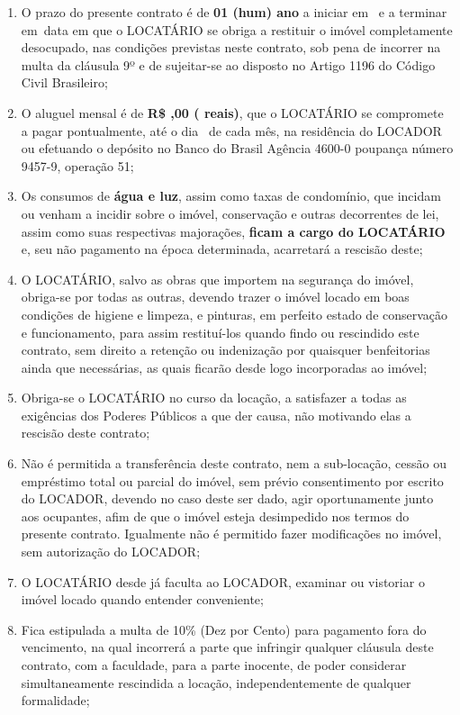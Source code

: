 \documentclass[a4paper,12pt]{article}
\begin{document}
\begin{enumerate}

\item O prazo do presente contrato é de \textbf{01 (hum) ano} a iniciar em 
\ e a terminar em\ data em que o LOCATÁRIO 
se obriga a restituir o imóvel completamente desocupado, nas condições previstas neste contrato,
sob pena de incorrer na multa da cláusula 9º e de sujeitar-se ao disposto no Artigo 1196 do Código Civil Brasileiro;
\item O aluguel mensal é de \textbf{R\$ ,00 ( reais)},
que o LOCATÁRIO se compromete a pagar pontualmente, até o dia \
de cada mês, na residência do LOCADOR ou efetuando o depósito no Banco do Brasil Agência 4600-0 poupança número 9457-9, operação 51; 
\item Os consumos de \textbf{água e luz}, assim como taxas de condomínio, que incidam ou venham a incidir sobre o imóvel, conservação e outras decorrentes de lei, assim como suas respectivas majorações, \textbf{ficam a cargo do LOCATÁRIO} e, seu não pagamento na época determinada, acarretará a rescisão deste; 
\item O LOCATÁRIO, salvo as obras que importem na segurança do imóvel, obriga-se por todas as outras, devendo trazer o imóvel locado em boas condições de higiene e limpeza, e pinturas, em perfeito estado de conservação e funcionamento, para assim restituí-los quando findo ou rescindido este contrato, sem direito a retenção ou indenização por quaisquer benfeitorias ainda que necessárias, as quais ficarão desde logo incorporadas ao imóvel; 
\item Obriga-se o LOCATÁRIO no curso da locação, a satisfazer a todas as exigências dos Poderes Públicos a que der causa, não motivando elas a rescisão deste contrato;  
\item Não é permitida a transferência deste contrato, nem a sub-locação, cessão ou empréstimo total ou parcial do imóvel, sem prévio consentimento por escrito do LOCADOR, devendo no caso deste ser dado, agir oportunamente junto aos ocupantes, afim de que o imóvel esteja desimpedido nos termos do presente contrato. Igualmente não é permitido fazer modificações no imóvel, sem autorização do LOCADOR;
\item O LOCATÁRIO desde já faculta ao LOCADOR, examinar ou vistoriar o imóvel locado quando entender conveniente;
\item Fica estipulada a multa de 10\% (Dez por Cento) para pagamento fora do vencimento, na qual incorrerá a parte que infringir qualquer cláusula deste contrato, com a faculdade, para a parte inocente, de poder considerar simultaneamente rescindida a locação, independentemente de qualquer formalidade;

\end{enumerate}
\end{document}

